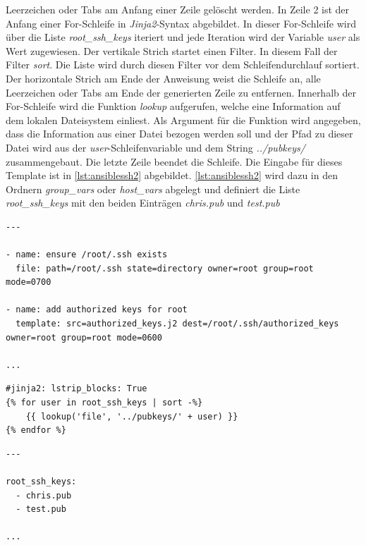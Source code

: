 \documentclass[titlepage]{report}
\begin{document}
Leerzeichen oder Tabs am Anfang einer Zeile gelöscht werden. In Zeile 2
ist der Anfang einer For\hyp{}Schleife in \emph{Jinja2}\hyp{}Syntax
abgebildet. In dieser For\hyp{}Schleife wird über die Liste
\emph{root\_ssh\_keys} iteriert und jede Iteration wird der Variable
\emph{user} als Wert zugewiesen. Der vertikale Strich startet einen
Filter. In diesem Fall der Filter \emph{sort}. Die Liste wird durch
diesen Filter vor dem Schleifendurchlauf sortiert. Der horizontale
Strich am Ende der Anweisung weist die Schleife an, alle Leerzeichen oder
Tabs am Ende der generierten Zeile zu entfernen. Innerhalb der
For\hyp{}Schleife wird die Funktion \emph{lookup} aufgerufen, welche
eine Information auf dem lokalen Dateisystem einliest. Als Argument für
die Funktion wird angegeben, dass die Information aus einer Datei
bezogen werden soll und der Pfad zu dieser Datei wird aus der
\emph{user}\hyp{}Schleifenvariable und dem String \emph{../pubkeys/}
zusammengebaut. Die letzte Zeile beendet die Schleife. Die Eingabe für
dieses Template ist in \autoref{lst:ansiblessh2} abgebildet. 
\autoref{lst:ansiblessh2} wird dazu in den Ordnern \emph{group\_vars}
oder \emph{host\_vars} abgelegt und definiert die Liste
\emph{root\_ssh\_keys} mit den beiden Einträgen \emph{chris.pub} und
\emph{test.pub}
\begin{minipage}{\linewidth}
\begin{lstlisting}[caption={Beispiel eines Ansible Tasks},label={lst:ansiblessh}]
---

- name: ensure /root/.ssh exists
  file: path=/root/.ssh state=directory owner=root group=root mode=0700

- name: add authorized keys for root
  template: src=authorized_keys.j2 dest=/root/.ssh/authorized_keys owner=root group=root mode=0600

...
\end{lstlisting}
\end{minipage}
\begin{minipage}{\linewidth}
\begin{lstlisting}[caption={Beispiel eines Jinja2-Templates},label={lst:ansiblejinja2}]
#jinja2: lstrip_blocks: True
{% for user in root_ssh_keys | sort -%}
	{{ lookup('file', '../pubkeys/' + user) }}
{% endfor %}
\end{lstlisting}
\end{minipage}
\begin{minipage}{\linewidth}
\begin{lstlisting}[caption={Daten für das Jinja2-Template Beispiel},label={lst:ansiblessh2}]
---

root_ssh_keys:
  - chris.pub
  - test.pub

...
\end{lstlisting}
\end{minipage}
\end{document}

